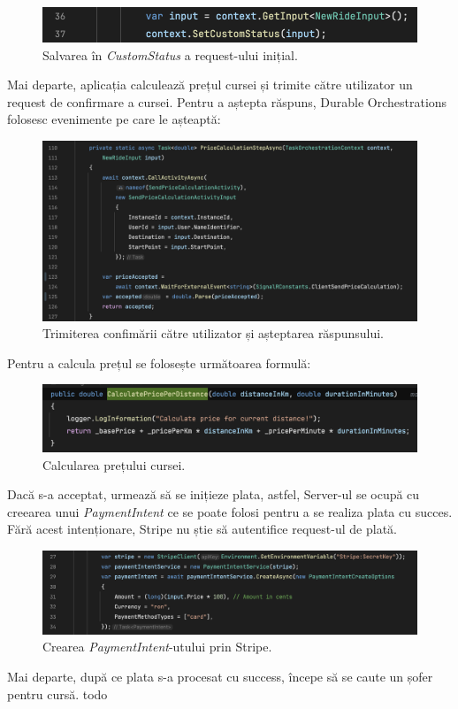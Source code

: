 \begin{figure}[H]
    \centering
    \includegraphics[width=14cm]{Assets/saveCustomStatus.png}
    \caption{Salvarea în \textit{CustomStatus} a request-ului inițial.}
    \label{fig:saveCustomStatus}
\end{figure}

Mai departe, aplicația calculează prețul cursei și trimite către utilizator un request de confirmare a cursei.
Pentru a aștepta răspuns, Durable Orchestrations folosesc evenimente pe care le așteaptă:
\begin{figure}[H]
    \centering
    \includegraphics[width=14cm]{Assets/waitForEvent.png}
    \caption{Trimiterea confimării către utilizator și așteptarea răspunsului.}
    \label{fig:waitForEvent}
\end{figure}
Pentru a calcula prețul se folosește următoarea formulă:
\begin{figure}[H]
    \centering
    \includegraphics[width=14cm]{Assets/calculatePrice.png}
    \caption{Calcularea prețului cursei.}
    \label{fig:calculatePrice}
\end{figure}
Dacă s-a acceptat, urmează să se inițieze plata, astfel, Server-ul se ocupă cu creearea
unui \textit{PaymentIntent} ce se poate folosi pentru a se realiza plata cu succes. Fără acest intenționare,
Stripe nu știe să autentifice request-ul de plată.
\begin{figure}[H]
    \centering
    \includegraphics[width=14cm]{Assets/intent.png}
    \caption{Crearea \textit{PaymentIntent}-utului prin Stripe.}
    \label{fig:intent}
\end{figure}
Mai departe, după ce plata s-a procesat cu success, începe să se caute un șofer pentru cursă.
todo

